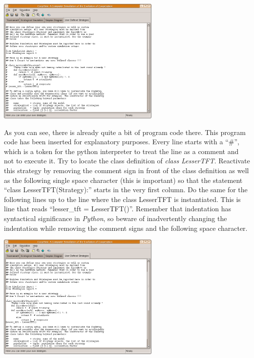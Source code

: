 \documentclass[12pt,a4paper,USenglish]{article}
\begin{document}
\begin{center}
\includegraphics[width=8cm,keepaspectratio]{big_images/user_page.png}
\end{center}

As you can see, there is already quite a bit of program code there.  This
program code has been inserted for explanatory purposes.  Every line starts
with a ``\#'', which is a token for the python interpreter to treat the line
as a comment and not to execute it. Try to locate the class definition of
\emph{class LesserTFT}.  Reactivate this strategy by removing the comment sign
in front of the class definition as well as the following single space
character (this is important) so that the statement ``class
LesserTFT(Strategy):'' starts in the very first column. Do the same for the
following lines up to the line where the class LesserTFT is instantiated. This
is line that reads ``lesser\_tft = LesserTFT()''. Remember that indentation
has syntactical significance in \emph{Python}, so beware of inadvertently
changing the indentation while removing the comment signs and the following
space character.

\begin{center}
\includegraphics[width=8cm,keepaspectratio]{big_images/user_page_modified.png}
\end{center}
\end{document}
